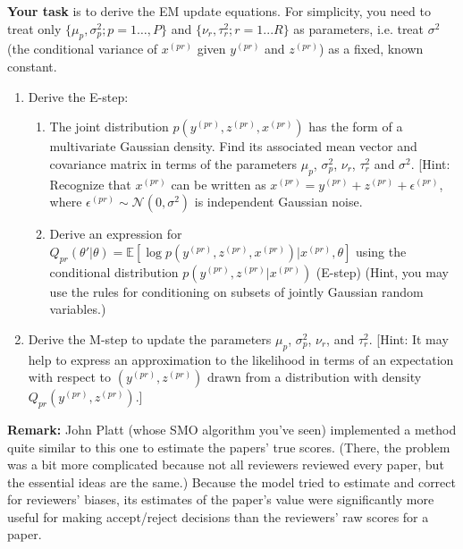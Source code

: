 \documentclass[12pt]{article}
\begin{document}
{\bf Your task} is to derive the EM update equations. For simplicity, you need to treat only $\{\mu_p,\sigma_p^2; p = 1\ldots,P\}$ and $\{\nu_r,\tau_r^2;r = 1...R\}$ as parameters, i.e. treat $\sigma^2$ (the conditional variance of $x^{(pr)}$ given $y^{(pr)}$ and $z^{(pr)}$) as a fixed, known constant.

\begin{enumerate}
\item Derive the E-step:

\begin{enumerate}
\item  The joint distribution $p(y^{(pr)},z^{(pr)},x^{(pr)})$ has the form of a multivariate Gaussian density. Find its associated mean vector and covariance matrix in terms of the parameters $\mu_p$, $\sigma_p^2$, $\nu_r$, $\tau_r^2$ and $\sigma^2$.
[Hint: Recognize that $x^{(pr)}$ can be written as $x^{(pr)} = y^{(pr)} + z^{(pr)} + \epsilon^{(pr)}$, where $\epsilon^{(pr)} \sim \mathcal{N}(0, \sigma^2)$ is independent Gaussian noise.

\item Derive an expression for $Q_{pr}(\theta'|\theta)  = \mathbb{E}[\log p(y^{(pr)}, z^{(pr)}, x^{(pr)})|x^{(pr)},\theta]$ using the conditional distribution $p(y^{(pr)},z^{(pr)}|x^{(pr)})$ (E-step) (Hint, you may use the rules for conditioning on subsets of jointly Gaussian random variables.) %
\end{enumerate}

\item Derive the M-step to update the parameters $\mu_p$, $\sigma_p^2$, $\nu_r$, and $\tau_r^2$. [Hint: It may help to express an approximation to the likelihood in terms of an expectation with respect to $(y^{(pr)}, z^{(pr)})$ drawn from a distribution with density $Q_{pr}(y^{(pr)}, z^{(pr)})$.]

\end{enumerate}

{\bf Remark:} John Platt (whose SMO algorithm you've seen) implemented a method quite similar to this one to estimate the papers' true scores. (There, the problem was a bit more complicated because not all reviewers reviewed every paper, but the essential ideas are the same.) Because the model tried to estimate and correct for reviewers' biases, its estimates of the paper's value were significantly more useful for making accept/reject decisions than the reviewers' raw scores for a paper.
\end{document}
